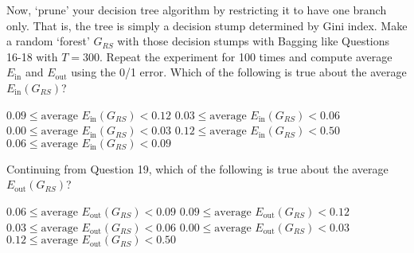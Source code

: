 \documentclass[a4paper,10pt]{exam}
\begin{document}
\begin{questions}
	    \question Now, `prune' your decision tree algorithm by restricting it to have one branch only. That is, the tree is simply a decision stump determined by Gini index. Make a random `forest' $G_{RS}$ with those decision stumps with Bagging like Questions 16-18 with $T=300$. Repeat the experiment for 100 times and compute average $E_{\text{in}}$ and $E_{\text{out}}$ using the 0/1 error.
	    Which of the following is true about the average $E_{\text{in}}(G_{RS})$?
	    
	    \begin{checkboxes}
	    	\CorrectChoice $0.09 \leq \mbox{average } E_{\text{in}}(G_{RS}) < 0.12$
	    	\choice $0.03 \leq \mbox{average } E_{\text{in}}(G_{RS}) < 0.06$
	    	\choice $0.00 \leq \mbox{average } E_{\text{in}}(G_{RS}) < 0.03$
	    	\choice $0.12 \leq \mbox{average } E_{\text{in}}(G_{RS}) < 0.50$
	    	\choice $0.06 \leq \mbox{average } E_{\text{in}}(G_{RS}) < 0.09$\\
	    \end{checkboxes}
	    
	    \question Continuing from Question 19, which of the following is true about the average $E_{\text{out}}(G_{RS})$?
	    \begin{checkboxes}
	      \choice $0.06 \leq \mbox{average } E_{\text{out}}(G_{RS}) < 0.09$
	      \choice $0.09 \leq \mbox{average } E_{\text{out}}(G_{RS}) < 0.12$
	      \choice $0.03 \leq \mbox{average } E_{\text{out}}(G_{RS}) < 0.06$
	      \choice $0.00 \leq \mbox{average } E_{\text{out}}(G_{RS}) < 0.03$
	      \CorrectChoice $0.12 \leq \mbox{average } E_{\text{out}}(G_{RS}) < 0.50$\\
	   \end{checkboxes}
	\end{questions}
\end{document}
